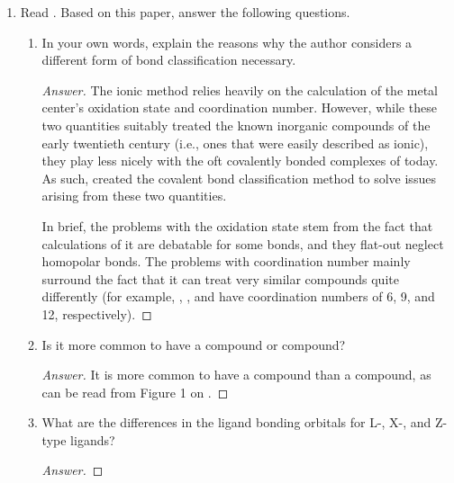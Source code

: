 \documentclass[../psets.tex]{subfiles}
\begin{document}
\begin{enumerate}
\begin{proof}[Answer]
    \end{proof}
    \newpage
    \item Read \textcite{bib:CBC}. Based on this paper, answer the following questions.
    \begin{enumerate}[label={\alph*)}]
        \item In your own words, explain the reasons why the author considers a different form of bond classification necessary.
        \begin{proof}[Answer]

            The ionic method relies heavily on the calculation of the metal center's oxidation state and coordination number. However, while these two quantities suitably treated the known inorganic compounds of the early twentieth century (i.e., ones that were easily described as ionic), they play less nicely with the oft covalently bonded complexes of today. As such, \textcite{bib:CBC} created the covalent bond classification method to solve issues arising from these two quantities.\par
            In brief, the problems with the oxidation state stem from the fact that calculations of it are debatable for some bonds, and they flat-out neglect homopolar bonds. The problems with coordination number mainly surround the fact that it can treat very similar compounds quite differently (for example, , , and  have coordination numbers of 6, 9, and 12, respectively).
        \end{proof}
        \item Is it more common to have a  compound or  compound?
        \begin{proof}[Answer]
            It is more common to have a  compound than a  compound, as can be read from Figure 1 on \textcite[128]{bib:CBC}.
        \end{proof}
        \item What are the differences in the ligand bonding orbitals for L-, X-, and Z-type ligands?
        \begin{proof}[Answer]


\end{proof}
\end{enumerate}
\end{enumerate}
\end{document}
